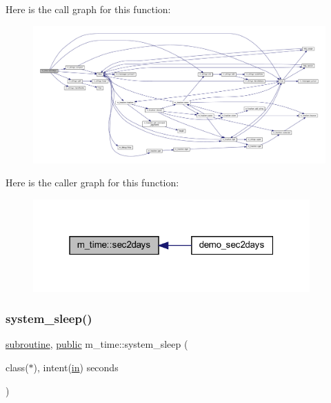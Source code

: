\begin{DoxyVerb}
Here is the call graph for this function\+:
\nopagebreak
\begin{figure}[H]
\begin{center}
\leavevmode
\includegraphics[width=350pt]{namespacem__time_a7788285d79b8d58323b05e9a30a2d992_cgraph}
\end{center}
\end{figure}
Here is the caller graph for this function\+:
\nopagebreak
\begin{figure}[H]
\begin{center}
\leavevmode
\includegraphics[width=301pt]{namespacem__time_a7788285d79b8d58323b05e9a30a2d992_icgraph}
\end{center}
\end{figure}
\mbox{\label{namespacem__time_a7c5d028ae1e1e01162ffc7bb55dcbbb1}} 
\subsubsection{\texorpdfstring{system\+\_\+sleep()}{system\_sleep()}}
{\footnotesize\ttfamily \hyperlink{M__stopwatch_83_8txt_acfbcff50169d691ff02d4a123ed70482}{subroutine}, \hyperlink{M__stopwatch_83_8txt_a2f74811300c361e53b430611a7d1769f}{public} m\+\_\+time\+::system\+\_\+sleep (\begin{DoxyParamCaption}\item[{class($\ast$), intent(\hyperlink{M__journal_83_8txt_afce72651d1eed785a2132bee863b2f38}{in})}]{seconds }\end{DoxyParamCaption})}




\end{DoxyVerb}
